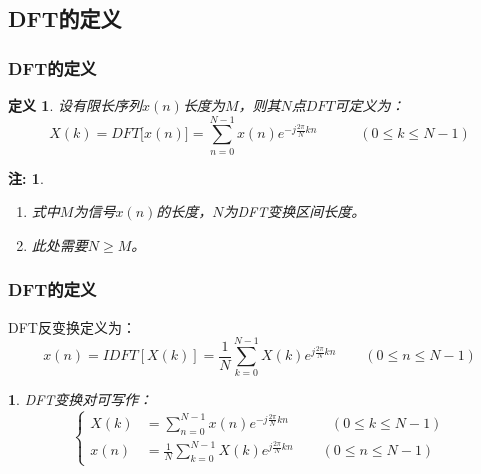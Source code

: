 \documentclass[notheorems,compress,mathserif,table]{beamer}
\newtheorem{definition}{定义}
\newtheorem{dablock}{}
\newtheorem{zhu}{注:}
\begin{document}
\subsection{DFT的定义}
%
%
\begin{frame}[shrink]\frametitle{DFT的定义}%
\begin{definition}
设有限长序列$x(n)$长度为$M$，则其$N$点$DFT$可定义为：
$$X(k) = DFT\big[x(n)\big] =  \sum_{n=0}^{N-1}x(n)e^{-j\frac{2\pi}{N}kn}  \quad\quad\quad (0 \leq k \leq N-1)$$
\end{definition}
\begin{zhu}
\begin{enumerate}
	\item [(1)]   式中$ M $为信号$ x(n) $的长度，$ N $为DFT变换区间长度。
	\item [(2)]  此处需要$ N\geq M $。
\end{enumerate}
\end{zhu}

\end{frame}
%
%
%
\begin{frame}[shrink]\frametitle{DFT的定义}%
    DFT反变换定义为：
    $$x(n) = IDFT[X(k)] =   \frac{1}{N}\sum_{k=0}^{N-1}X(k)e^{j\frac{2\pi}{N}kn} \quad\quad (0 \leq n \leq N-1)$$
   \begin{dablock}
    DFT变换对可写作：
    \begin{equation*}
           \left\{ \begin{aligned}
               X(k) &=  \sum_{n=0}^{N-1}x(n)e^{-j\frac{2\pi}{N}kn}  \quad\quad\quad (0 \leq k \leq N-1) \\
               x(n) &=   \frac{1}{N}\sum_{k=0}^{N-1}X(k)e^{j\frac{2\pi}{N}kn} \quad\quad (0 \leq n \leq N-1)
           \end{aligned} \right.
    \end{equation*}
\end{dablock}
\end{frame}
%
%
%
\end{document}
